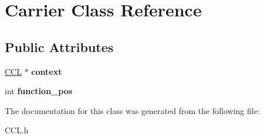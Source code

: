 \hypertarget{classCarrier}{\section{Carrier Class Reference}
\label{classCarrier}
}
\subsection*{Public Attributes}
\begin{DoxyCompactItemize}
\item 
\hypertarget{classCarrier_a8bd26115fd87eae4876f3a603a6270dc}{\hyperlink{classCCL}{C\-C\-L} $\ast$ {\bfseries context}}\label{classCarrier_a8bd26115fd87eae4876f3a603a6270dc}

\item 
\hypertarget{classCarrier_ab7511f094cea027dd9828dd77deaa6cf}{int {\bfseries function\-\_\-pos}}\label{classCarrier_ab7511f094cea027dd9828dd77deaa6cf}

\end{DoxyCompactItemize}


The documentation for this class was generated from the following file\-:\begin{DoxyCompactItemize}
\item 
C\-C\-L.\-h\end{DoxyCompactItemize}
